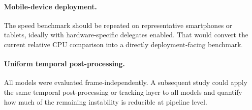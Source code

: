 \paragraph{Mobile-device deployment.}
The speed benchmark should be repeated on representative smartphones or tablets, ideally with hardware-specific delegates enabled. That would convert the current relative CPU comparison into a directly deployment-facing benchmark.

\paragraph{Uniform temporal post-processing.}
All models were evaluated frame-independently. A subsequent study could apply the same temporal post-processing or tracking layer to all models and quantify how much of the remaining instability is reducible at pipeline level.
